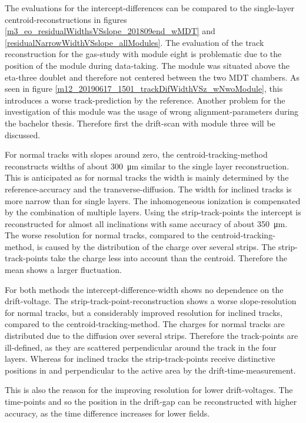 \documentclass[
twoside,            %
BCOR1.4cm,          %
10pt,               %
headings=normal,    %
headsepline,        %
clearplainpage,		%
final,              %
div=14,
open=right,
bibliography=toc
]{scrreprt}
\begin{document}
The evaluations for the intercept-differences can be compared to the single-layer centroid-reconstructions in figures \ref{m3_eo_residualWidthsVSslope_201809end_wMDT} and \ref{residualNarrowWidthVSslope_allModules}.
The evaluation of the track reconstruction for the gas-study with module eight is problematic due to the position of the module during data-taking.
The module was situated above the eta-three doublet and therefore not centered between the two MDT chambers.
As seen in figure \ref{m12_20190617_1501_trackDifWidthVSz_wNwoModule}, this introduces a worse track-prediction by the reference.
Another problem for the investigation of this module was the usage of wrong alignment-parameters during the bachelor thesis.
Therefore first the drift-scan with module three will be discussed.

For normal tracks with slopes around zero, the centroid-tracking-method reconstructs widths of about \SI{300}{\micro\m} similar to the single layer reconstruction.
This is anticipated as for normal tracks the width is mainly determined by the reference-accuracy and the transverse-diffusion.
The width for inclined tracks is more narrow than for single layers. 
The inhomogeneous ionization is compensated by the combination of multiple layers.
Using the strip-track-points the intercept is reconstructed for almost all inclinations with same accuracy of about \SI{350}{\micro\m}.
The worse resolution for normal tracks, compared to the centroid-tracking-method, is caused by the distribution of the charge over several strips.
The strip-track-points take the charge less into account than the centroid.
Therefore the mean shows a larger fluctuation.

For both methods the intercept-difference-width shows no dependence on the drift-voltage.
The strip-track-point-reconstruction shows a worse slope-resolution for normal tracks, but a considerably improved resolution for inclined tracks, compared to the centroid-tracking-method.
The charges for normal tracks are distributed due to the diffusion over several strips.
Therefore the track-points are ill-defined, as they are scattered perpendicular around the track in the four layers.
Whereas for inclined tracks the strip-track-points receive distinctive positions in and perpendicular to the active area by the drift-time-measurement.

This is also the reason for the improving resolution for lower drift-voltages.
The time-points and so the position in the drift-gap can be reconstructed with higher accuracy, as the time difference increases for lower fields.
\end{document}
